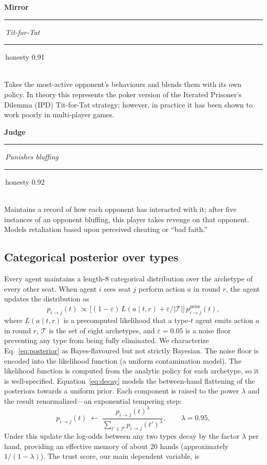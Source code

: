 \documentclass[10pt,twocolumn,letterpaper]{article}
\newcommand{\arch}[1]{\textbf{#1}}
\newcommand{\bbar}{\,\rule[-0.5pt]{0.5pt}{8pt}\,}
\newcommand{\archentry}[4]{%
  \par\vspace{5pt}\noindent
  {\sffamily\fontsize{10}{12}\selectfont\arch{#1}\bbar\textit{#2}\bbar honesty #3}\\[1pt]
  \small #4\par}
\begin{document}
\archentry{Mirror}{Tit-for-Tat}{0.91}{%
  Takes the most-active opponent's behaviours and blends them with
  its own policy. In theory this represents the poker version of the
  Iterated Prisoner's Dilemma (IPD) Tit-for-Tat strategy; however, in
  practice it has been shown to work poorly in multi-player
  games.}

\archentry{Judge}{Punishes bluffing}{0.92}{%
  Maintains a record of how each opponent has interacted with it;
  after five instances of an opponent bluffing, this player takes
  revenge on that opponent. Models retaliation based upon perceived
  cheating or ``bad faith.''}

\subsection{Categorical posterior over types}\label{sec:posterior}
Every agent maintains a length-8 categorical distribution over the
archetype of every other seat. When agent $i$ sees seat $j$ perform
action $a$ in round $r$, the agent updates the distribution as
\begin{equation}
  p_{i\to j}(t)\,\propto\,
    \bigl[(1-\varepsilon)\,L(a\mid t,r)
          + \varepsilon/|\mathcal{T}|\bigr]\,
    p_{i\to j}^{\text{prior}}(t),
  \label{eq:posterior}
\end{equation}
where $L(a\mid t, r)$ is a precomputed likelihood that a type-$t$
agent emits action $a$ in round $r$, $\mathcal{T}$ is the set of
eight archetypes, and $\varepsilon = 0.05$ is a noise floor
preventing any type from being fully eliminated. We characterize
Eq.~\ref{eq:posterior} as Bayes-flavoured but not strictly
Bayesian. The noise floor is encoded into the likelihood function
(a uniform contamination model). The likelihood function is computed
from the analytic policy for each archetype, so it is well-specified.
Equation~\ref{eq:decay} models the between-hand flattening of the
posteriors towards a uniform prior. Each component is raised to the
power $\lambda$ and the result renormalized---an exponential
tempering step:
\begin{equation}
  p_{i\to j}(t) \;\leftarrow\;
    \frac{p_{i\to j}(t)^{\lambda}}
         {\sum_{t'\in\mathcal{T}} p_{i\to j}(t')^{\lambda}},
  \qquad \lambda = 0.95,
  \label{eq:decay}
\end{equation}
Under this update the log-odds between any two types decay by the
factor $\lambda$ per hand, providing an effective memory of about 20
hands (approximately $1/(1-\lambda)$). The trust score, our main dependent variable, is
\end{document}
